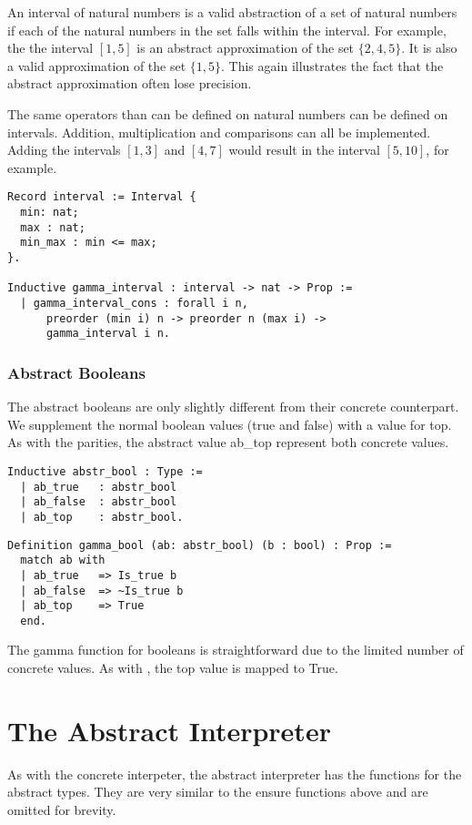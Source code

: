 An interval of natural numbers is a valid abstraction of a set of natural
numbers if each of the natural numbers in the set falls within the interval.
For example, the the interval $[1,5]$ is an abstract approximation of the set
$\{2, 4, 5\}$. It is also a valid approximation of the set $\{1,5\}$. This
again illustrates the fact that the abstract approximation often lose 
precision.

The same operators than can be defined on natural numbers can be defined on
intervals. Addition, multiplication and comparisons can all be implemented.
Adding the intervals $[1,3]$ and $[4, 7]$ would result in the interval $[5,
10]$, for example. 

\begin{listing}
\begin{verbatim}
Record interval := Interval {
  min: nat;
  max : nat;
  min_max : min <= max;
}.

Inductive gamma_interval : interval -> nat -> Prop :=
  | gamma_interval_cons : forall i n, 
      preorder (min i) n -> preorder n (max i) ->
      gamma_interval i n.
\end{verbatim}
\end{listing}

\subsubsection{Abstract Booleans}
The abstract booleans are only slightly different from their concrete
counterpart. We supplement the normal boolean values (true and false) with
a value for top. As with the parities, the abstract value ab\_top
represent both concrete values.

\begin{verbatim}
Inductive abstr_bool : Type :=
  | ab_true   : abstr_bool
  | ab_false  : abstr_bool
  | ab_top    : abstr_bool.
\end{verbatim}

\begin{verbatim}
Definition gamma_bool (ab: abstr_bool) (b : bool) : Prop :=
  match ab with
  | ab_true   => Is_true b
  | ab_false  => ~Is_true b
  | ab_top    => True
  end.
\end{verbatim}

The gamma function for booleans is straightforward due to the limited
number of concrete values. As with , the top 
value is mapped to True.

\section{The Abstract Interpreter}
As with the concrete interpeter, the abstract interpreter has the
 functions for the abstract types. 
They are very similar to the ensure functions above and are omitted for brevity. 


